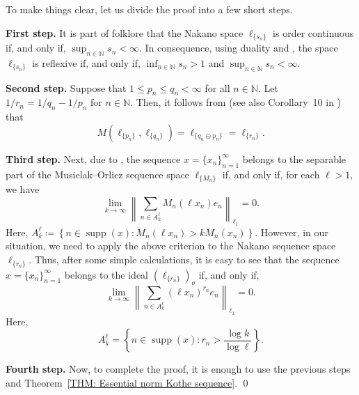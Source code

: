 \documentclass[11pt]{amsart}
\theoremstyle{definition}
\theoremstyle{definition}
\theoremstyle{definition}
\theoremstyle{definition}
\theoremstyle{definition}
\theoremstyle{definition}
\theoremstyle{definition}
\theoremstyle{definition}
\numberwithin{equation}{section}
\numberwithin{equation}{section}
\numberwithin{equation}{section}
\theoremstyle{definition}
\theoremstyle{definition}
\theoremstyle{definition}
\theoremstyle{definition}
\theoremstyle{definition}
\theoremstyle{definition}
\DeclareMathOperator{\supp}{supp}
\newcommand{\norm}[1]{\left\lVert#1\right\rVert}
\renewenvironment{proof}{\noindent {\bf Proof.}}{\qed}
\begin{document}
	\begin{proof}
		To make things clear, let us divide the proof into a few short steps.
		
		{\bf First step.} It is part of folklore that the Nakano space $\ell_{\{s_n\}}$ is order continuous if, and only if, $\sup_{n \in \mathbb{N}} s_n < \infty$.
		In consequence, using duality and \cite[Corollary~4.4, p.~23]{BS88}, the space $\ell_{\{s_n\}}$ is reflexive if, and only if, $\inf_{n \in \mathbb{N}} s_n > 1$
		and $\sup_{n \in \mathbb{N}} s_n < \infty$.
		
		{\bf Second step.} Suppose that $1 \leqslant p_n \leqslant q_n < \infty$ for all $n \in \mathbb{N}$.
		Let $1/r_n = 1/q_n - 1/p_n$ for $n \in \mathbb{N}$. Then, it follows from \cite[Theorem~9]{LT21}
		(see also Corollary~10 in \cite{LT21}) that
		\begin{equation*}
			M\left( \ell_{\{p_n\}}, \ell_{\{q_n\}} \right) = \ell_{\{q_n \ominus p_n\}} = \ell_{\{r_n\}}.
		\end{equation*}
		
		{\bf Third step.} Next, due to \cite[Theorem~11]{KP12}, the sequence $x = \{x_n\}_{n=1}^{\infty}$ belongs to the separable part of the
		Musielak--Orlicz sequence space $\ell_{\{M_n\}}$ if, and only if, for each $\ell > 1$, we have
		\begin{equation*}
			\lim_{k \rightarrow \infty} \norm{  \sum_{n \in A_k^{\ell}} M_n\left( \ell x_n \right) e_n }_{\ell_1} = 0.
		\end{equation*}
		Here, $A_k^{\ell} \coloneqq \left\{ n \in \supp(x) \colon M_n(\ell x_n) > k M_n(x_n) \right\}$.
		However, in our situation, we need to apply the above criterion to the Nakano sequence space $\ell_{\{r_n\}}$.
		Thus, after some simple calculations, it is easy to see that the sequence $x = \{x_n\}_{n=1}^{\infty}$
		belongs to the ideal $(\ell_{\{r_n\}})_o$ if, and only if, 
		\begin{equation*}
			\lim_{k \rightarrow \infty} \norm{ \sum_{n \in A_k^{\ell}} \left( \ell x_n \right)^{r_n} e_n }_{\ell_1} = 0.
		\end{equation*}
		Here,
		\begin{equation*}
			A_k^{\ell} = \left\{ n \in \supp(x) \colon r_n > \frac{\log k}{\log \ell} \right\}.
		\end{equation*}
	
		{\bf Fourth step.} Now, to complete the proof, it is enough to use the previous steps and Theorem~\ref{THM: Essential norm Kothe sequence}.
	\end{proof}
\end{document}

